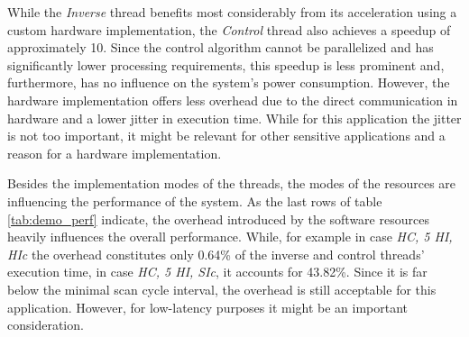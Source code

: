 While the \emph{Inverse} thread benefits most considerably from its
acceleration using a custom hardware implementation, the \emph{Control} thread
also achieves a speedup of approximately 10. Since the control algorithm
cannot be parallelized and has significantly lower processing requirements,
this speedup is less prominent and, furthermore, has no influence on the
system's power consumption. However, the hardware implementation offers less
overhead due to the direct communication in hardware and a lower jitter in
execution time. While for this application the jitter is not too important, it
might be relevant for other sensitive applications and a reason for a hardware
implementation.

Besides the implementation modes of the threads, the modes of the resources
are influencing the performance of the system. As the last rows of table
\ref{tab:demo_perf} indicate, the overhead introduced by the software
resources heavily influences the overall performance. While, for example in
case \emph{HC, 5 HI, HIc} the overhead constitutes only 0.64\% of the inverse
and control threads' execution time, in case \emph{HC, 5 HI, SIc}, it accounts
for 43.82\%. Since it is far below the minimal scan cycle interval, the
overhead is still acceptable for this application. However, for low-latency
purposes it might be an important consideration.

